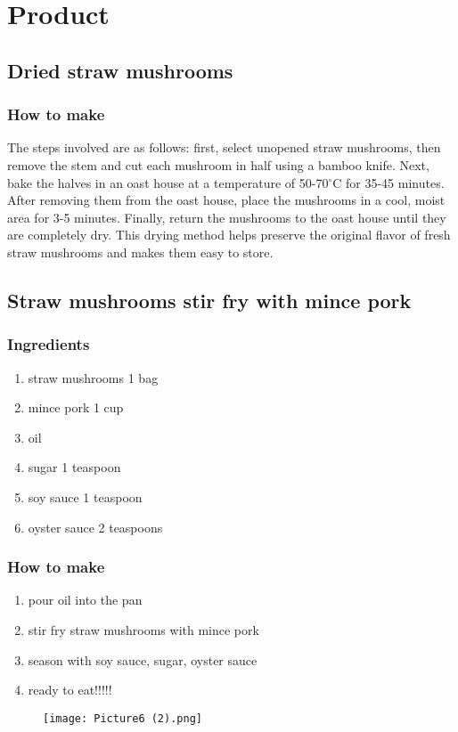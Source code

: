 \chapter{Product}
\section{Dried straw mushrooms}
\subsection{How to make}
The steps involved are as follows: first, select unopened straw mushrooms, then remove the stem and cut each mushroom in half using a bamboo knife. Next, bake the halves in an oast house at a temperature of 50-70$^\circ$C for 35-45 minutes. After removing them from the oast house, place the mushrooms in a cool, moist area for 3-5 minutes. Finally, return the mushrooms to the oast house until they are completely dry. This drying method helps preserve the original flavor of fresh straw mushrooms and makes them easy to store.
\section{Straw mushrooms stir fry with mince pork}
\subsection{Ingredients}
\begin{enumerate}
    \item straw mushrooms  1 bag
    \item mince pork  1 cup
    \item oil  
    \item sugar  1 teaspoon
    \item soy sauce  1 teaspoon
    \item oyster sauce  2 teaspoons
\end{enumerate}
\subsection{How to make}
\begin{enumerate}
    \item pour oil into the pan
    \item stir fry straw mushrooms with mince pork
    \item season with soy sauce, sugar, oyster sauce
    \item ready to eat!!!!!
\end{enumerate}
\begin{figure}[h]
    \texttt{[image: Picture6 (2).png]}
\end{figure}

